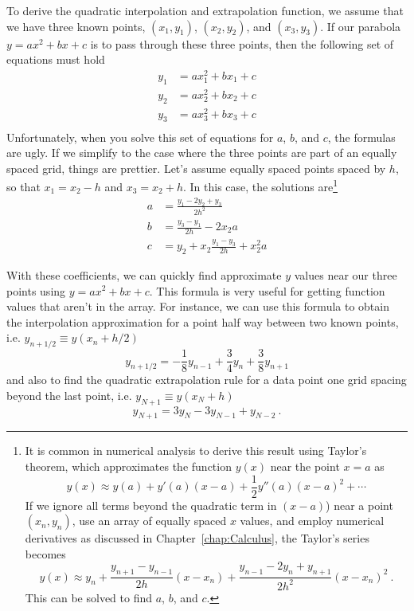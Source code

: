 To derive the quadratic interpolation and extrapolation function,
we assume that we have three known points, $(x_1,y_1)$,
$(x_2,y_2)$, and $(x_3,y_3)$.  If our parabola $y=a x^2 + bx + c$ is
to pass through these three points, then the following set of
equations must hold
\begin{equation}
    \begin{aligned}
    y_1 &= a x_1^2 + bx_1 + c \\
    y_2 &= a x_2^2 + bx_2 + c \\
    y_3 &= a x_3^2 + bx_3 + c \\
    \end{aligned}
\end{equation}
Unfortunately, when you solve this set of equations for $a$, $b$,
and $c$, the formulas are ugly. If we simplify to the case where
the three points are part of an equally spaced grid, things are
prettier.  Let's assume equally spaced points spaced by $h$, so
that $x_1=x_2-h$ and $x_3=x_2+h$. In this case, the solutions
are\footnote{It is common in numerical analysis to derive this
result using  Taylor's theorem, which
approximates the function $y(x)$ near the point $x=a$ as
\[
y(x) \approx y(a) + y'(a)(x-a) + \frac{1}{2} y''(a) (x-a)^2 + \cdots
\]
If we ignore all terms beyond the quadratic term in $(x-a)$) near a
point $(x_n,y_n)$, use an array of equally spaced $x$ values, and
employ numerical derivatives as discussed in
Chapter~\ref{chap:Calculus}, the Taylor's series becomes
\[
y(x) \approx y_n + \frac{y_{n+1}-y_{n-1} }{ 2 h} (x-x_n)
+ \frac{y_{n-1}-2 y_n + y_{n+1} }{ 2 h^2} (x-x_n)^2 ~.
\]
This can be solved to find $a$, $b$, and $c$.
}
\begin{equation}
    \begin{aligned}
    a &= \frac{y_1-2y_2+y_3}{2h^2} \\
    b &= \frac{y_3-y_1}{2h} -2x_2 a \\
    c &= y_2 + x_2 \frac{y_1-y_3}{2h} + x_2^2 a
    \end{aligned}
\end{equation}

With these coefficients, we can quickly find approximate $y$ values
near our three points using $y=a x^2 + bx + c$. This formula is
very useful for getting function values that aren't in the array.
For instance, we can use this formula to obtain the interpolation
approximation for a point half way between two known points, i.e.
$y_{n+1/2} \equiv y(x_n+h/2)$
\begin{equation}
y_{n+1/2} = -\frac{1}{8} y_{n-1} + \frac{3}{4} y_n + \frac{3}{8}
y_{n+1}
\end{equation}
and also to find the quadratic extrapolation rule for a data point
one grid spacing beyond the last point, i.e. $y_{N+1} \equiv y(x_N
+ h)$
\begin{equation}
y_{N+1} = 3 y_N - 3 y_{N-1} + y_{N-2} ~.
\end{equation}



